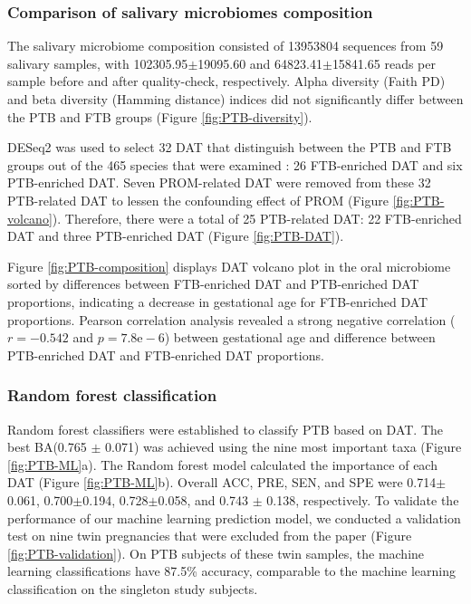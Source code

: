 \documentclass[11pt, a4paper, onecolumn, oneside]{report}
\begin{document}
            \subsubsection{Comparison of salivary microbiomes composition}
                The salivary microbiome composition consisted of 13953804 sequences from 59 salivary samples, with 102305.95$\pm$19095.60 and 64823.41$\pm$15841.65 reads per sample before and after quality-check, respectively. Alpha diversity (Faith PD) and beta diversity (Hamming distance) indices did not significantly differ between the PTB and FTB groups (Figure \ref{fig:PTB-diversity}).

                DESeq2 was used to select 32 DAT that distinguish between the PTB and FTB groups out of the 465 species that were examined \cite{DESeq2-1}: 26 FTB-enriched DAT and six PTB-enriched DAT. Seven PROM-related DAT were removed from these 32 PTB-related DAT to lessen the confounding effect of PROM (Figure \ref{fig:PTB-volcano}). Therefore, there were a total of 25 PTB-related DAT: 22 FTB-enriched DAT and three PTB-enriched DAT (Figure \ref{fig:PTB-DAT}).

                Figure \ref{fig:PTB-composition} displays DAT volcano plot in the oral microbiome sorted by differences between FTB-enriched DAT and PTB-enriched DAT proportions, indicating a decrease in gestational age for FTB-enriched DAT proportions. Pearson correlation analysis revealed a strong negative correlation ($r = -0.542$ and $p = 7.8\textrm{e}-6$) between gestational age and difference between PTB-enriched DAT and FTB-enriched DAT proportions.

            \subsubsection{Random forest classification}
                Random forest classifiers were established to classify PTB based on DAT. The best BA(0.765 $\pm$ 0.071) was achieved using the nine most important taxa (Figure \ref{fig:PTB-ML}a). The Random forest model calculated the importance of each DAT (Figure \ref{fig:PTB-ML}b). Overall ACC, PRE, SEN, and SPE were 0.714$\pm$0.061, 0.700$\pm$0.194, 0.728$\pm$0.058, and 0.743 $\pm$ 0.138, respectively. To validate the performance of our machine learning prediction model, we conducted a validation test on nine twin pregnancies that were excluded from the paper (Figure \ref{fig:PTB-validation}). On PTB subjects of these twin samples, the machine learning classifications have 87.5\% accuracy, comparable to the machine learning classification on the singleton study subjects.
\end{document}
